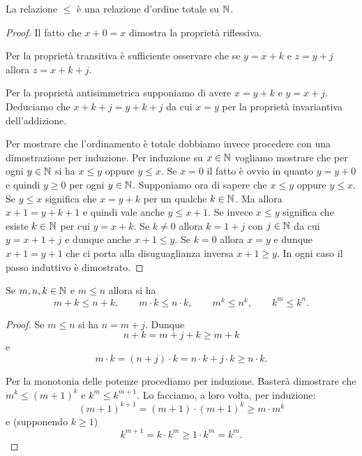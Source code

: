 \begin{theorem}
  \label{th:proprieta_ordine_N}
La relazione $\le$ è una relazione d'ordine totale su ${\mathbb N}$.
\end{theorem}
%
\begin{proof}
  Il fatto che $x+0=x$ dimostra la proprietà riflessiva.
  
  Per la proprietà transitiva è sufficiente osservare
  che se $y=x+k$ e $z=y+j$ allora $z=x+k+j$.

  Per la proprietà antisimmetrica supponiamo di avere $x=y+k$ 
  e $y=x+j$. Deduciamo che $x+k+j = y +k+j$ da cui $x=y$
  per la proprietà invariantiva dell'addizione.
  
  Per mostrare che l'ordinamento è totale dobbiamo invece 
  procedere con una dimostrazione per induzione. 
  Per induzione su $x\in {\mathbb N}$ vogliamo mostrare 
  che per ogni $y\in {\mathbb N}$ si ha $x\le y$ oppure $y\le x$. 
  Se $x=0$ il fatto è ovvio in quanto $y=y+0$ e quindi $y\ge 0$
  per ogni $y\in {\mathbb N}$.
  Supponiamo ora di sapere che $x\le y$ oppure $y\le x$.
  Se $y\le x$ significa che $x = y + k$ per un qualche 
  $k\in {\mathbb N}$. Ma allora $x+1 = y + k + 1$ e quindi 
  vale anche $y\le x+1$. 
  Se invece $x\le y$ significa che esiste $k\in {\mathbb N}$ 
  per cui $y=x+k$. Se $k\neq 0$ allora $k=1+j$ con $j\in {\mathbb N}$
  da cui $y=x+1+j$ e dunque anche $x+1\le y$.
  Se $k=0$ allora $x=y$ e dunque $x+1=y+1$ che ci porta 
  alla disuguaglianza inversa $x+1\ge y$.
  In ogni caso il passo induttivo è dimostrato.
\end{proof}

\begin{theorem}
  \label{th:monotonia_naturali}%
  Se $m,n,k\in {\mathbb N}$ e $m\le n$ allora si ha 
  \[
    m+k\le n+k,
    \qquad 
    m\cdot k \le n\cdot k,
    \qquad
    m^k\le n^k,
    \qquad
    k^m\le k^n.
  \]
\end{theorem}
\begin{proof}
  Se $m\le n$ si ha $n=m+j$. 
  Dunque
  \[
  n+k = m + j + k \ge m+k   
  \] 
  e
  \[
  m\cdot k = (n+j)\cdot k = n\cdot k + j\cdot k \ge n\cdot k.  
  \]

  Per la monotonia delle potenze procediamo per induzione.
  Basterà dimostrare che $m^k\le(m+1)^k$ e $k^m\le k^{m+1}$.
  Lo facciamo, a loro volta, per induzione:
  \[
  (m+1)^{k+1} = (m+1)\cdot (m+1)^k \ge m\cdot m^k
  \]
  e (supponendo $k\ge 1$)
  \[
  k^{m+1} = k\cdot k^m \ge 1\cdot k^m = k^m. 
  \]
\end{proof}

